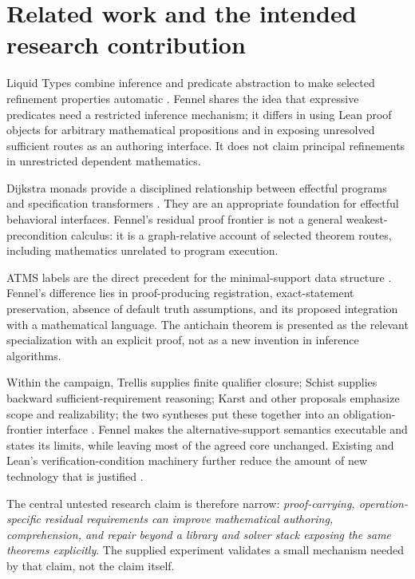 \documentclass[11pt,a4paper]{article}
\theoremstyle{definition}
\theoremstyle{remark}
\newcommand{\code}[1]{\texttt{\detokenize{#1}}}
\begin{document}
\section{Related work and the intended research contribution}
\label{sec:related}
Liquid Types combine inference and predicate abstraction to make selected
refinement properties automatic \cite{liquid}. Fennel shares the idea that
expressive predicates need a restricted inference mechanism; it differs in
using Lean proof objects for arbitrary mathematical propositions and in
exposing unresolved sufficient routes as an authoring interface. It does not
claim principal refinements in unrestricted dependent mathematics.

Dijkstra monads provide a disciplined relationship between effectful programs
and specification transformers \cite{dm}. They are an appropriate foundation
for effectful behavioral interfaces. Fennel's residual proof frontier is not
a general weakest-precondition calculus: it is a graph-relative account of
selected theorem routes, including mathematics unrelated to program execution.

ATMS labels are the direct precedent for the minimal-support data structure
\cite{atms}. Fennel's difference lies in proof-producing registration,
exact-statement preservation, absence of default truth assumptions, and its
proposed integration with a mathematical language. The antichain theorem is
presented as the relevant specialization with an explicit proof, not as a new
invention in inference algorithms.

Within the campaign, Trellis supplies finite qualifier closure; Schist supplies
backward sufficient-requirement reasoning; Karst and other proposals emphasize
scope and realizability; the two syntheses put these together into an
obligation-frontier interface \cite{trellis,synA,synB}. Fennel makes the
alternative-support semantics executable and states its limits, while leaving
most of the agreed core unchanged. Existing \code{fun_prop} and Lean's
verification-condition machinery further reduce the amount of new technology
that is justified \cite{funprop,mvcgen}.

The central untested research claim is therefore narrow: \emph{proof-carrying,
operation-specific residual requirements can improve mathematical authoring,
comprehension, and repair beyond a library and solver stack exposing the same
theorems explicitly}. The supplied experiment validates a small mechanism
needed by that claim, not the claim itself.
\end{document}
